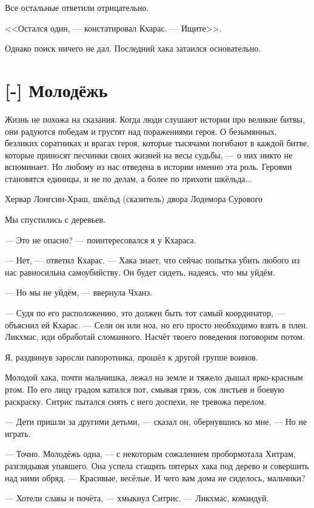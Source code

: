Все остальные ответили отрицательно.

<<Остался один, --- констатировал Кхарас.
--- Ищите>>.

Однако поиск ничего не дал.
Последний хака затаился основательно.

\section{[-] Молодёжь}

\epigraph
{Жизнь не похожа на сказания.
Когда люди слушают истории про великие битвы, они радуются победам и грустят над поражениями героя.
О безымянных, безликих соратниках и врагах героя, которые тысячами погибают в каждой битве, которые приносят песчинки своих жизней на весы судьбы, --- о них никто не вспоминает.
Но любому из нас отведена в истории именно эта роль.
Героями становятся единицы, и не по делам, а более по прихоти шкёльда...}
{Хервар Лонгсин-Храш, шкёльд (сказитель) двора Лодемора Сурового}

Мы спустились с деревьев.

--- Это не опасно? --- поинтересовался я у Кхараса.

--- Нет, --- ответил Кхарас.
--- Хака знает, что сейчас попытка убить любого из нас равносильна самоубийству.
Он будет сидеть, надеясь, что мы уйдём.

--- Но мы не уйдём, --- ввернула Чханэ.

--- Судя по его расположению, это должен быть тот самый координатор, --- объяснил ей Кхарас.
--- Сели он или ноа, но его просто необходимо взять в плен.
Ликхмас, иди обработай сломанного.
Насчёт твоего поведения поговорим потом.

Я, раздвинув заросли папоротника, прошёл к другой группе воинов.

Молодой хака, почти мальчишка, лежал на земле и тяжело дышал ярко-красным ртом.
По его лицу градом катился пот, смывая грязь, сок листьев и боевую раскраску.
Ситрис пытался снять с него доспехи, не тревожа перелом.

--- Дети пришли за другими детьми, --- сказал он, обернувшись ко мне.
--- Но не играть.

--- Точно.
Молодёжь одна, --- с некоторым сожалением пробормотала Хитрам, разглядывая упавшего.
Она успела стащить пятерых хака под дерево и совершить над ними обряд.
--- Красивые, весёлые.
И чего вам дома не сиделось, мальчики?

--- Хотели славы и почёта, --- хмыкнул Ситрис.
--- Ликхмас, командуй.

